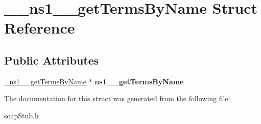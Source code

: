 \hypertarget{struct____ns1____getTermsByName}{
\section{\_\-\_\-ns1\_\-\_\-getTermsByName Struct Reference}
\label{struct____ns1____getTermsByName}
}
\subsection*{Public Attributes}
\begin{DoxyCompactItemize}
\item 
\hypertarget{struct____ns1____getTermsByName_a3d5e5f27709e591a2e5d119dd656973c}{
\hyperlink{class__ns1____getTermsByName}{\_\-ns1\_\-\_\-getTermsByName} $\ast$ {\bfseries ns1\_\-\_\-getTermsByName}}
\label{struct____ns1____getTermsByName_a3d5e5f27709e591a2e5d119dd656973c}

\end{DoxyCompactItemize}


The documentation for this struct was generated from the following file:\begin{DoxyCompactItemize}
\item 
soapStub.h\end{DoxyCompactItemize}
